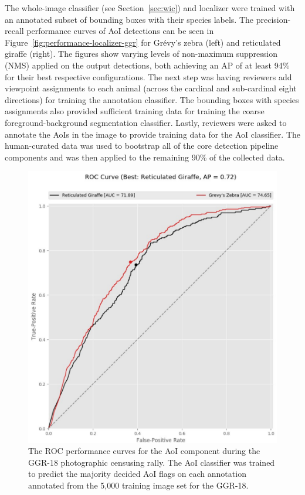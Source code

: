 The whole-image classifier (see Section~\ref{sec:wic}) and localizer were trained with an annotated subset of bounding boxes with their species labels.  The precision-recall performance curves of AoI detections can be seen in Figure~\ref{fig:performance-localizer-ggr} for Gr\'evy's zebra (left) and reticulated giraffe (right).  The figures show varying levels of non-maximum suppression (NMS) applied on the output detections, both achieving an AP of at least 94\% for their best respective configurations.  The next step was having reviewers add viewpoint assignments to each animal (across the cardinal and sub-cardinal eight directions) for training the annotation classifier.  The bounding boxes with species assignments also provided sufficient training data for training the coarse foreground-background segmentation classifier.  Lastly, reviewers were asked to annotate the AoIs in the image to provide training data for the AoI classifier.  The human-curated data was used to bootstrap all of the core detection pipeline components and was then applied to the remaining 90\% of the collected data.

\begin{figure}[!t]
    \begin{center}
        \includegraphics[width=0.6\linewidth]{resources/aoi2-precision-recall-roc-ggr2.pdf}
    \end{center}
    \caption{The ROC performance curves for the AoI component during the GGR-18 photographic censusing rally.  The AoI classifier was trained to predict the majority decided AoI flags on each annotation annotated from the 5,000 training image set for the GGR-18.}
    \label{fig:performance-aoi-ggr}
\end{figure}

